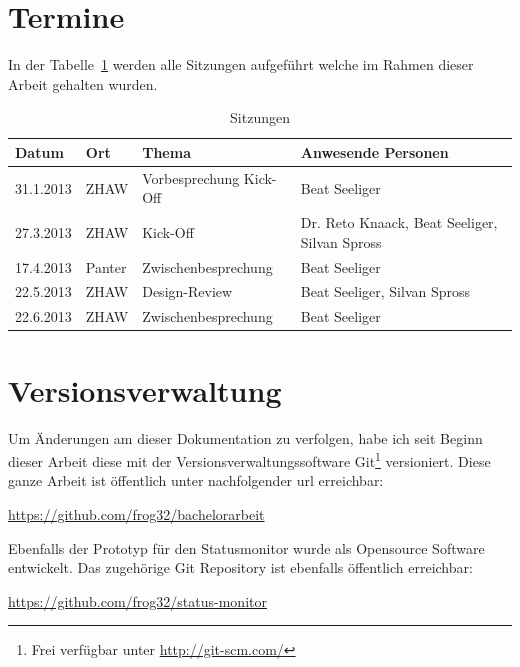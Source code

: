 \section{Termine}
\label{sec:termine}
In der Tabelle~\ref{tab:sitzungen} werden alle Sitzungen aufgeführt welche im Rahmen dieser Arbeit gehalten wurden.

\begin{table}[h]
  \centering
  \begin{tabular}{lll p{7cm}}
  \toprule
    Datum & Ort & Thema & Anwesende Personen\\
  \hline
    31.1.2013 & ZHAW & Vorbesprechung Kick-Off & Beat Seeliger\\
  \hline
    27.3.2013 & ZHAW & Kick-Off & Dr. Reto Knaack, Beat Seeliger, Silvan Spross\\
  \hline
    17.4.2013 & Panter & Zwischenbesprechung & Beat Seeliger\\
  \hline
    22.5.2013 & ZHAW & Design-Review & Beat Seeliger, Silvan Spross\\
  \hline
    22.6.2013 & ZHAW & Zwischenbesprechung & Beat Seeliger\\
  \bottomrule
  \end{tabular}
  \caption{Sitzungen}
  \label{tab:sitzungen}
\end{table}

\section{Versionsverwaltung}
\label{sec:versionsverwaltung}
Um Änderungen am dieser Dokumentation zu verfolgen, habe ich seit Beginn dieser Arbeit diese mit der Versionsverwaltungssoftware Git\footnote{Frei verfügbar unter \url{http://git-scm.com/}} versioniert. Diese ganze Arbeit ist öffentlich unter nachfolgender \acrshort{url} erreichbar:

\url{https://github.com/frog32/bachelorarbeit}

Ebenfalls der Prototyp für den Statusmonitor wurde als Opensource Software entwickelt. Das zugehörige Git Repository ist ebenfalls öffentlich erreichbar:

\url{https://github.com/frog32/status-monitor}


